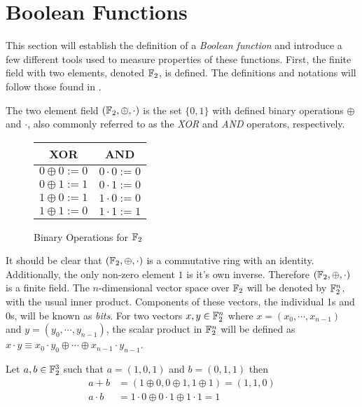 \section{Boolean Functions}
\par This section will establish the definition of a {\em Boolean function} and introduce
a few different tools used to measure properties of these functions. First, the
finite field with two elements, denoted $\mathbb{F}_2$, is defined. The definitions and
notations will follow those found in \cite{bk:cs09}.

\par The two element field $(\mathbb{F}_2,\oplus,\cdot)$ is the set $\{0,1\}$ with defined binary
operations $\oplus$ and $\cdot$, also commonly referred to as the {\em XOR} and
{\em AND} operators, respectively.
\begin{figure}[h!]\label{fig:GF(2)}
	\centering
	\begin{tabular}{|c|c|}
		\hline
		XOR&AND\\
		\hline
		$0\oplus0:=0$&$0\cdot0:=0$\\
		$0\oplus1:=1$&$0\cdot1:=0$\\
		$1\oplus0:=1$&$1\cdot0:=0$\\
		$1\oplus1:=0$&$1\cdot1:=1$\\
		\hline
	\end{tabular}
	\caption{Binary Operations for $\mathbb{F}_2$}
\end{figure}
\par It should be clear that $(\mathbb{F}_2,\oplus,\cdot)$ is a commutative ring with an
identity. Additionally, the only non-zero element $1$ is it's own inverse. Therefore
$(\mathbb{F}_2,\oplus,\cdot)$ is a finite field. The $n$-dimensional vector space over $\mathbb{F}_2$
will be denoted by $\mathbb{F}_2^n$, with the usual inner product. Components of these vectors,
the individual 1s and 0s, will be known as {\em bits}. For two vectors $x,y\in\mathbb{F}_2^n$
where $x=(x_0,\cdots,x_{n-1})$ and $y=(y_0,\cdots,y_{n-1})$, the scalar product in
$\mathbb{F}_2^n$ will be defined as $x\cdot y\equiv x_0\cdot y_0 \oplus \cdots \oplus x_{n-1}\cdot y_{n-1}$.

\begin{example}
	Let $a,b\in\mathbb{F}_2^3$ such that $a=(1,0,1)$ and $b=(0,1,1)$ then
	\begin{align*}
		a+b      &=(1\oplus0,0\oplus1,1\oplus1)=(1,1,0) \\
		a\cdot b &=1\cdot0\oplus0\cdot1\oplus1\cdot1=1
	\end{align*}
\end{example}

